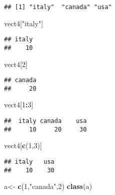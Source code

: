 \documentclass[
]{article}
\newenvironment{Shaded}{\begin{snugshade}}{\end{snugshade}}
\newcommand{\DecValTok}[1]{\textcolor[rgb]{0.00,0.00,0.81}{#1}}
\newcommand{\FunctionTok}[1]{\textcolor[rgb]{0.13,0.29,0.53}{\textbf{#1}}}
\newcommand{\NormalTok}[1]{#1}
\newcommand{\OtherTok}[1]{\textcolor[rgb]{0.56,0.35,0.01}{#1}}
\newcommand{\SpecialCharTok}[1]{\textcolor[rgb]{0.81,0.36,0.00}{\textbf{#1}}}
\newcommand{\StringTok}[1]{\textcolor[rgb]{0.31,0.60,0.02}{#1}}
\begin{document}
\begin{verbatim}
## [1] "italy"  "canada" "usa"
\end{verbatim}

\begin{Shaded}
\begin{Highlighting}[]
\NormalTok{vect4[}\StringTok{"italy"}\NormalTok{]}
\end{Highlighting}
\end{Shaded}

\begin{verbatim}
## italy 
##    10
\end{verbatim}

\begin{Shaded}
\begin{Highlighting}[]
\NormalTok{vect4[}\DecValTok{2}\NormalTok{]}
\end{Highlighting}
\end{Shaded}

\begin{verbatim}
## canada 
##     20
\end{verbatim}

\begin{Shaded}
\begin{Highlighting}[]
\NormalTok{vect4[}\DecValTok{1}\SpecialCharTok{:}\DecValTok{3}\NormalTok{]}
\end{Highlighting}
\end{Shaded}

\begin{verbatim}
##  italy canada    usa 
##     10     20     30
\end{verbatim}

\begin{Shaded}
\begin{Highlighting}[]
\NormalTok{vect4[}\FunctionTok{c}\NormalTok{(}\DecValTok{1}\NormalTok{,}\DecValTok{3}\NormalTok{)]}
\end{Highlighting}
\end{Shaded}

\begin{verbatim}
## italy   usa 
##    10    30
\end{verbatim}

\begin{Shaded}
\begin{Highlighting}[]
\NormalTok{a}\OtherTok{\textless{}{-}} \FunctionTok{c}\NormalTok{(}\DecValTok{1}\NormalTok{,}\StringTok{"canada"}\NormalTok{,}\DecValTok{2}\NormalTok{)}
\FunctionTok{class}\NormalTok{(a)}
\end{Highlighting}
\end{Shaded}
\end{document}
